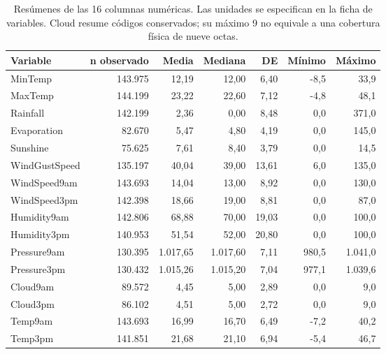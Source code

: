 \documentclass[11pt,a4paper]{article}
\begin{document}
\begin{table}[H]
\centering
\small
\renewcommand{\arraystretch}{1.18}
\setlength{\tabcolsep}{5pt}
\begin{tabularx}{\linewidth}{@{}lrrrrrr@{}}
\toprule

\textbf{Variable} & \textbf{n observado} & \textbf{Media} & \textbf{Mediana} & \textbf{DE} & \textbf{Mínimo} & \textbf{Máximo} \\
\midrule

MinTemp & 143.975 & 12,19 & 12,00 & 6,40 & -8,5 & 33,9 \\

MaxTemp & 144.199 & 23,22 & 22,60 & 7,12 & -4,8 & 48,1 \\

Rainfall & 142.199 & 2,36 & 0,00 & 8,48 & 0,0 & 371,0 \\

Evaporation & 82.670 & 5,47 & 4,80 & 4,19 & 0,0 & 145,0 \\

Sunshine & 75.625 & 7,61 & 8,40 & 3,79 & 0,0 & 14,5 \\

WindGustSpeed & 135.197 & 40,04 & 39,00 & 13,61 & 6,0 & 135,0 \\

WindSpeed9am & 143.693 & 14,04 & 13,00 & 8,92 & 0,0 & 130,0 \\

WindSpeed3pm & 142.398 & 18,66 & 19,00 & 8,81 & 0,0 & 87,0 \\

Humidity9am & 142.806 & 68,88 & 70,00 & 19,03 & 0,0 & 100,0 \\

Humidity3pm & 140.953 & 51,54 & 52,00 & 20,80 & 0,0 & 100,0 \\

Pressure9am & 130.395 & 1.017,65 & 1.017,60 & 7,11 & 980,5 & 1.041,0 \\

Pressure3pm & 130.432 & 1.015,26 & 1.015,20 & 7,04 & 977,1 & 1.039,6 \\

Cloud9am & 89.572 & 4,45 & 5,00 & 2,89 & 0,0 & 9,0 \\

Cloud3pm & 86.102 & 4,51 & 5,00 & 2,72 & 0,0 & 9,0 \\

Temp9am & 143.693 & 16,99 & 16,70 & 6,49 & -7,2 & 40,2 \\

Temp3pm & 141.851 & 21,68 & 21,10 & 6,94 & -5,4 & 46,7 \\

\bottomrule
\end{tabularx}

\caption{Resúmenes de las 16 columnas numéricas. Las unidades se especifican en la ficha de variables. Cloud resume códigos conservados; su máximo 9 no equivale a una cobertura física de nueve octas.}
\label{tab:3}

\end{table}
\end{document}
